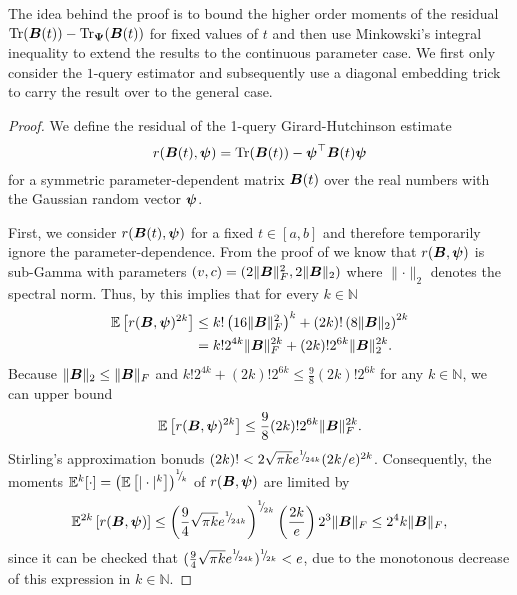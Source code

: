 \documentclass[12pt]{article}
\begin{document}
The idea behind the proof is to bound the higher order moments of the residual $\operatorname{Tr}(\boldsymbol{B}(t)) - \operatorname{Tr}_{\boldsymbol{\Psi}}(\boldsymbol{B}(t))$ for fixed values of $t$ and then use Minkowski's integral inequality to extend the results to the continuous parameter case. We first only consider the $1$-query estimator and subsequently use a diagonal embedding trick to carry the result over to the general case.
\begin{proof} 
    We define the residual of the 1-query Girard-Hutchinson estimate 
    \begin{equation}
        r(\boldsymbol{B}(t), \boldsymbol{\psi}) = \operatorname{Tr}(\boldsymbol{B}(t)) - \boldsymbol{\psi}^{\top} \boldsymbol{B}(t) \boldsymbol{\psi}
    \end{equation}
    for a symmetric parameter-dependent matrix $\boldsymbol{B}(t)$ over the real numbers with the Gaussian random vector $\boldsymbol{\psi}$.

    First, we consider $r(\boldsymbol{B}(t), \boldsymbol{\psi})$ for a fixed $t \in [a,b]$ and therefore temporarily ignore the parameter-dependence. From the proof of \cite[lemma 3]{cortinovis-2022-randomized-trace} we know that $r(\boldsymbol{B}, \boldsymbol{\psi})$ is sub-Gamma with parameters $(v, c) = (2 \lVert \boldsymbol{B} \rVert _F^2, 2 \lVert \boldsymbol{B} \rVert _2)$ where $\lVert \cdot \rVert _2$ denotes the spectral norm. Thus, by \cite[theorem 2.3]{boucheron-2013-basic-inequalities} this implies that for every $k \in \mathbb{N}$
    \begin{align}
        \mathbb{E}\left[ r(\boldsymbol{B}, \boldsymbol{\psi})^{2 k} \right]
        &\leq k! \left( 16 \lVert \boldsymbol{B} \rVert _F^2 \right)^k + (2 k)! \left( 8 \lVert \boldsymbol{B} \rVert _2 \right)^{2 k} \notag \\
        &= k! 2^{4 k} \lVert \boldsymbol{B} \rVert _F^{2 k} + (2 k)! 2^{6 k} \lVert \boldsymbol{B} \rVert _2^{2 k}.
    \end{align}
    Because $\lVert \boldsymbol{B} \rVert _2 \leq \lVert \boldsymbol{B} \rVert _F$ and $k! 2^{4 k} + (2 k)! 2^{6 k} \leq \frac{9}{8}(2 k)! 2^{6 k}$ for any $k \in \mathbb{N}$, we can upper bound 
    \begin{equation}
        \mathbb{E}\left[ r(\boldsymbol{B}, \boldsymbol{\psi})^{2 k} \right] \leq \frac{9}{8} (2 k)! 2^{6 k} \lVert \boldsymbol{B} \rVert _F^{2k}.
    \end{equation}
    Stirling's approximation \cite{robbins-1955-remark-stirling} bonuds $(2 k)! < 2 \sqrt{\pi k}  e^{{}^{1}{\mskip -5mu/\mskip -3mu}_{24 k}} ( 2 k / e )^{2 k}$. Consequently, the moments $\mathbb{E}^{k}[\cdot] = \left(\mathbb{E}\left[ | \cdot |^{k} \right] \right)^{{}^{1}{\mskip -5mu/\mskip -3mu}_{k}}$ of $r(\boldsymbol{B}, \boldsymbol{\psi})$ are limited by
    \begin{equation}
        \mathbb{E}^{2k}\left[ r(\boldsymbol{B}, \boldsymbol{\psi}) \right]
        \leq \left( \frac{9}{4} \sqrt{\pi k} e^{{}^{1}{\mskip -5mu/\mskip -3mu}_{24 k}} \right)^{{}^{1}{\mskip -5mu/\mskip -3mu}_{2k}} \left( \frac{2 k}{e}\right) 2^{3} \lVert \boldsymbol{B} \rVert _F \leq 2^4 k \lVert \boldsymbol{B} \rVert _F,
        \label{equ:hutchinson-trace-onequery-fixed}
    \end{equation}
    since it can be checked that $(\frac{9}{4} \sqrt{\pi k} e^{{}^{1}{\mskip -5mu/\mskip -3mu}_{24 k}})^{{}^{1}{\mskip -5mu/\mskip -3mu}_{2k}} < e$, due to the monotonous decrease of this expression in $k \in \mathbb{N}$.


\end{proof}
\end{document}
